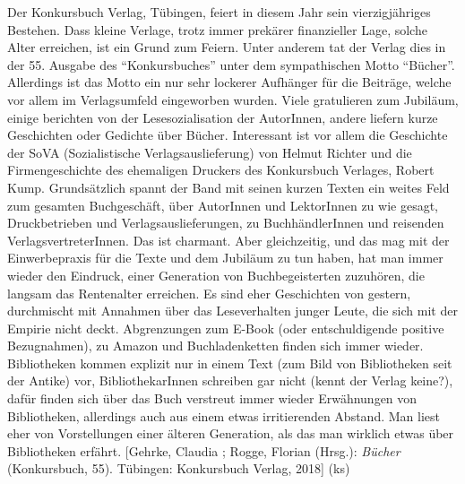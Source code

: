 \documentclass[a4paper,
fontsize=11pt,
oneside,
numbers=noperiodatend,
parskip=half-,
bibliography=totoc,
final
]{scrartcl}
\begin{document}
Der Konkursbuch Verlag, Tübingen, feiert in diesem Jahr sein
vierzigjähriges Bestehen. Dass kleine Verlage, trotz immer prekärer
finanzieller Lage, solche Alter erreichen, ist ein Grund zum Feiern.
Unter anderem tat der Verlag dies in der 55. Ausgabe des
\enquote{Konkursbuches} unter dem sympathischen Motto \enquote{Bücher}.
Allerdings ist das Motto ein nur sehr lockerer Aufhänger für die
Beiträge, welche vor allem im Verlagsumfeld eingeworben wurden. Viele
gratulieren zum Jubiläum, einige berichten von der Lesesozialisation der
AutorInnen, andere liefern kurze Geschichten oder Gedichte über Bücher.
Interessant ist vor allem die Geschichte der SoVA (Sozialistische
Verlagsauslieferung) von Helmut Richter und die Firmengeschichte des
ehemaligen Druckers des Konkursbuch Verlages, Robert Kump. Grundsätzlich
spannt der Band mit seinen kurzen Texten ein weites Feld zum gesamten
Buchgeschäft, über AutorInnen und LektorInnen zu wie gesagt,
Druckbetrieben und Verlagsauslieferungen, zu BuchhändlerInnen und
reisenden VerlagsvertreterInnen. Das ist charmant. Aber gleichzeitig,
und das mag mit der Einwerbepraxis für die Texte und dem Jubiläum zu tun
haben, hat man immer wieder den Eindruck, einer Generation von
Buchbegeisterten zuzuhören, die langsam das Rentenalter erreichen. Es
sind eher Geschichten von gestern, durchmischt mit Annahmen über das
Leseverhalten junger Leute, die sich mit der Empirie nicht deckt.
Abgrenzungen zum E-Book (oder entschuldigende positive Bezugnahmen), zu
Amazon und Buchladenketten finden sich immer wieder. Bibliotheken kommen
explizit nur in einem Text (zum Bild von Bibliotheken seit der Antike)
vor, BibliothekarInnen schreiben gar nicht (kennt der Verlag keine?),
dafür finden sich über das Buch verstreut immer wieder Erwähnungen von
Bibliotheken, allerdings auch aus einem etwas irritierenden Abstand. Man
liest eher von Vorstellungen einer älteren Generation, als das man
wirklich etwas über Bibliotheken erfährt. {[}Gehrke, Claudia ; Rogge,
Florian (Hrsg.): \emph{Bücher} (Konkursbuch, 55). Tübingen: Konkursbuch
Verlag, 2018{]} (ks)
\end{document}
